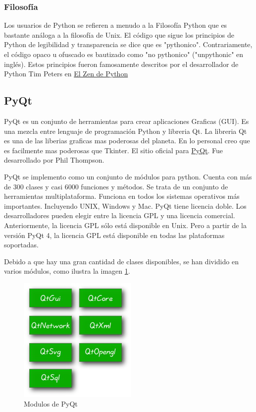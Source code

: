 \documentclass[12pt]{article} %
\begin{document}
     	\subsubsection{Filosofía}
     		Los usuarios de Python se refieren a menudo a la Filosofía Python que es bastante análoga a la filosofía de Unix. El código que sigue los principios de Python de
     		legibilidad y transparencia se dice que es "pythonico". Contrariamente, el código opaco u ofuscado es bautizado como "no pythonico" ("unpythonic" en inglés). Estos
     		principios fueron famosamente descritos por el desarrollador de Python Tim Peters en \href{https://www.python.org/dev/peps/pep-0020/}{El Zen de Python}
     		
    \subsection{PyQt \label{pyqt}}
    	PyQt es un conjunto de herramientas para crear aplicaciones Graficas (GUI). Es una mezcla entre lenguaje de programación Python y libreria Qt. La libreria Qt es 
    	una de las liberias graficas mas poderosas del planeta. En lo personal creo que es facilmente mas poderosas que Tkinter. El sitio oficial para 
    	\href{http://www.riverbankcomputing.co.uk/software/pyqt/}{PyQt}. Fue desarrollado por Phil Thompson.
    	
    	PyQt se implemento como un conjunto de módulos para python. Cuenta con más de 300 clases y casi 6000 funciones y métodos. Se trata de un conjunto de herramientas
    	multiplataforma. Funciona en todos los sistemas operativos más importantes. Incluyendo UNIX, Windows y Mac. PyQt tiene licencia doble. Los desarrolladores pueden 
    	elegir entre la licencia GPL y una licencia comercial. Anteriormente, la licencia GPL sólo está disponible en Unix. Pero a partir de la versión PyQt 4, la licencia 
    	GPL está disponible en todas las plataformas soportadas.
    	
    	Debido a que hay una gran cantidad de clases disponibles, se han dividido en varios módulos, como ilustra la imagen \ref{pyqt_modulos}.
    	\begin{figure}[h!]%
			\centering
			\includegraphics[scale=0.5]{./imagenes/pyqt}
			\caption{Modulos de PyQt}\label{pyqt_modulos}
		\end{figure}	
\end{document}
